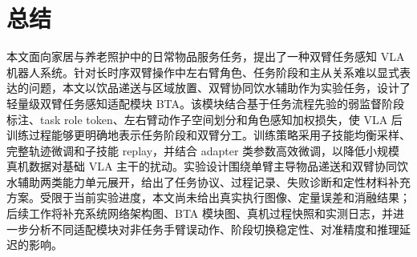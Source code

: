 \documentclass[UTF8,a4paper,zihao=5,scheme=chinese]{ctexart}
\numberwithin{figure}{section}
\numberwithin{table}{section}
\begin{document}
\clearpage
\section{总结}

本文面向家居与养老照护中的日常物品服务任务，提出了一种双臂任务感知 VLA 机器人系统。针对长时序双臂操作中左右臂角色、任务阶段和主从关系难以显式表达的问题，本文以饮品递送与区域放置、双臂协同饮水辅助作为实验任务，设计了轻量级双臂任务感知适配模块 BTA。该模块结合基于任务流程先验的弱监督阶段标注、task role token、左右臂动作子空间划分和角色感知加权损失，使 VLA 后训练过程能够更明确地表示任务阶段和双臂分工。训练策略采用子技能均衡采样、完整轨迹微调和子技能 replay，并结合 adapter 类参数高效微调，以降低小规模真机数据对基础 VLA 主干的扰动。实验设计围绕单臂主导物品递送和双臂协同饮水辅助两类能力单元展开，给出了任务协议、过程记录、失败诊断和定性材料补充方案。受限于当前实验进度，本文尚未给出真实执行图像、定量误差和消融结果；后续工作将补充系统网络架构图、BTA 模块图、真机过程快照和实测日志，并进一步分析不同适配模块对非任务手臂误动作、阶段切换稳定性、对准精度和推理延迟的影响。
\end{document}
